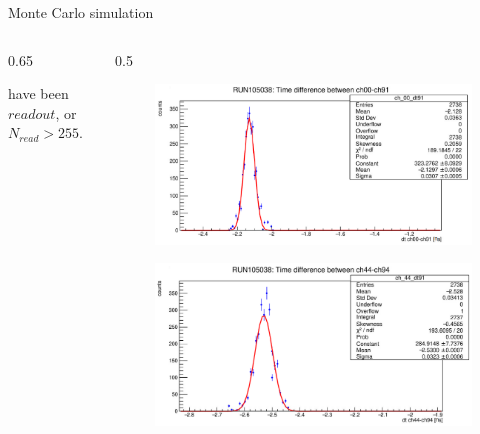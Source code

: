 \documentclass{beamer}
\begin{document}
\begin{frame}{Monte Carlo simulation}
\begin{columns}
\begin{column}{0.65\framewidth}
\begin{itemize}
{ have been $readout$, or $N_{read}>255$. }
\end{itemize}
   \end{column}
   \begin{column}{0.5\framewidth}
    \begin{figure}[H]
        \centering
    \includegraphics[width=\columnwidth]{figures/png/Screenshot from 2023-12-03 11-50-50.png}
    \label{fig:delay1}
  \end{figure}
  \begin{figure}[H]
        \centering
    \includegraphics[width=\columnwidth]{figures/png/Screenshot from 2023-12-03 11-50-33.png}

    \label{fig:delay2}
  \end{figure}
   \end{column}
  \end{columns}



    \end{frame}

    
\end{document}
